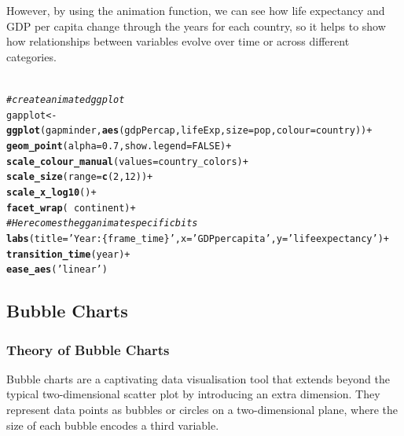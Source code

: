 \documentclass{article}\usepackage[]{graphicx}\usepackage[]{xcolor}
\makeatletter
\newcommand{\hlnum}[1]{\textcolor[rgb]{0.686,0.059,0.569}{#1}}%
\newcommand{\hlstr}[1]{\textcolor[rgb]{0.192,0.494,0.8}{#1}}%
\newcommand{\hlcom}[1]{\textcolor[rgb]{0.678,0.584,0.686}{\textit{#1}}}%
\newcommand{\hlopt}[1]{\textcolor[rgb]{0,0,0}{#1}}%
\newcommand{\hlstd}[1]{\textcolor[rgb]{0.345,0.345,0.345}{#1}}%
\newcommand{\hlkwb}[1]{\textcolor[rgb]{0.69,0.353,0.396}{#1}}%
\newcommand{\hlkwc}[1]{\textcolor[rgb]{0.333,0.667,0.333}{#1}}%
\newcommand{\hlkwd}[1]{\textcolor[rgb]{0.737,0.353,0.396}{\textbf{#1}}}%
\newenvironment{kframe}{%
 \def\at@end@of@kframe{}%
 \ifinner\ifhmode%
  \def\at@end@of@kframe{\end{minipage}}%
  \begin{minipage}{\columnwidth}%
 \fi\fi%
 \def\FrameCommand##1{\hskip\@totalleftmargin \hskip-\fboxsep
 \colorbox{shadecolor}{##1}\hskip-\fboxsep
     \hskip-\linewidth \hskip-\@totalleftmargin \hskip\columnwidth}%
 \MakeFramed {\advance\hsize-\width
   \@totalleftmargin\z@ \linewidth\hsize
   \@setminipage}}%
 {\par\unskip\endMakeFramed%
 \at@end@of@kframe}
\newenvironment{knitrout}{}{} %
\numberwithin{equation}{section}
\makeatother
\begin{document}
\noindent
However, by using the animation function, we can see how life expectancy and GDP per capita change through the years for each country, so it helps to show how relationships between variables evolve over time or across different categories. \\
\\
\begin{knitrout}\scriptsize
{}\color{fgcolor}\begin{kframe}
\begin{alltt}
\hlcom{# create animated ggplot}
\hlstd{gapplot}\hlkwb{<-}\hlkwd{ggplot}\hlstd{(gapminder,} \hlkwd{aes}\hlstd{(gdpPercap, lifeExp,} \hlkwc{size} \hlstd{= pop,} \hlkwc{colour} \hlstd{= country))} \hlopt{+}
  \hlkwd{geom_point}\hlstd{(}\hlkwc{alpha} \hlstd{=} \hlnum{0.7}\hlstd{,} \hlkwc{show.legend} \hlstd{=} \hlnum{FALSE}\hlstd{)} \hlopt{+}
  \hlkwd{scale_colour_manual}\hlstd{(}\hlkwc{values} \hlstd{= country_colors)} \hlopt{+}
  \hlkwd{scale_size}\hlstd{(}\hlkwc{range} \hlstd{=} \hlkwd{c}\hlstd{(}\hlnum{2}\hlstd{,} \hlnum{12}\hlstd{))} \hlopt{+}
  \hlkwd{scale_x_log10}\hlstd{()} \hlopt{+}
  \hlkwd{facet_wrap}\hlstd{(}\hlopt{~}\hlstd{continent)} \hlopt{+}
  \hlcom{# Here comes the gganimate specific bits}
  \hlkwd{labs}\hlstd{(}\hlkwc{title} \hlstd{=} \hlstr{'Year: \{frame_time\}'}\hlstd{,} \hlkwc{x} \hlstd{=} \hlstr{'GDP per capita'}\hlstd{,} \hlkwc{y} \hlstd{=} \hlstr{'life expectancy'}\hlstd{)} \hlopt{+}
  \hlkwd{transition_time}\hlstd{(year)} \hlopt{+}
  \hlkwd{ease_aes}\hlstd{(}\hlstr{'linear'}\hlstd{)}
\end{alltt}
\end{kframe}
\end{knitrout}




\subsection{Bubble Charts}
\subsubsection{Theory of Bubble Charts}
\noindent Bubble charts are a captivating data visualisation tool that extends beyond the typical two-dimensional scatter plot by introducing an extra dimension. They represent data points as bubbles or circles on a two-dimensional plane, where the size of each bubble encodes a third variable.\\
\end{document}

